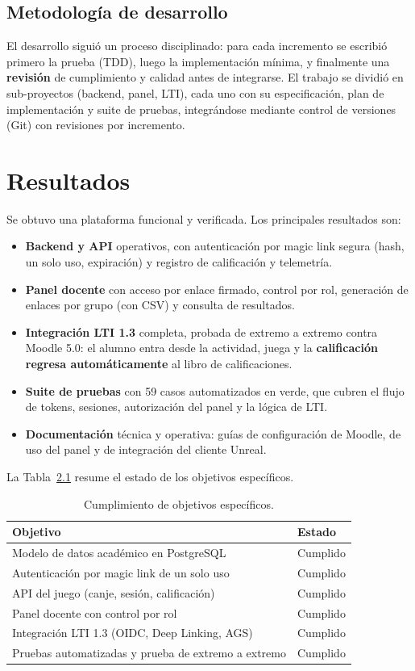 \documentclass[12pt,letterpaper,oneside]{report}
\begin{document}
\section{Metodología de desarrollo}
El desarrollo siguió un proceso disciplinado: para cada incremento se escribió
primero la prueba (TDD), luego la implementación mínima, y finalmente una
\textbf{revisión} de cumplimiento y calidad antes de integrarse. El trabajo se
dividió en sub-proyectos (backend, panel, LTI), cada uno con su especificación,
plan de implementación y suite de pruebas, integrándose mediante control de
versiones (Git) con revisiones por incremento.

\chapter{Resultados}

Se obtuvo una plataforma funcional y verificada. Los principales resultados son:

\begin{itemize}[leftmargin=1.4em]
  \item \textbf{Backend y API} operativos, con autenticación por magic link
  segura (hash, un solo uso, expiración) y registro de calificación y telemetría.
  \item \textbf{Panel docente} con acceso por enlace firmado, control por rol,
  generación de enlaces por grupo (con CSV) y consulta de resultados.
  \item \textbf{Integración LTI 1.3} completa, probada de extremo a extremo contra
  Moodle 5.0: el alumno entra desde la actividad, juega y la \textbf{calificación
  regresa automáticamente} al libro de calificaciones.
  \item \textbf{Suite de pruebas} con 59 casos automatizados en verde, que cubren
  el flujo de tokens, sesiones, autorización del panel y la lógica de LTI.
  \item \textbf{Documentación} técnica y operativa: guías de configuración de
  Moodle, de uso del panel y de integración del cliente Unreal.
\end{itemize}

La Tabla~\ref{tab:result} resume el estado de los objetivos específicos.

\begin{longtable}{p{10.5cm} p{2.8cm}}
\caption{Cumplimiento de objetivos específicos.}\label{tab:result}\\
\toprule
\textbf{Objetivo} & \textbf{Estado} \\ \midrule
\endhead
Modelo de datos académico en PostgreSQL & Cumplido \\
Autenticación por magic link de un solo uso & Cumplido \\
API del juego (canje, sesión, calificación) & Cumplido \\
Panel docente con control por rol & Cumplido \\
Integración LTI 1.3 (OIDC, Deep Linking, AGS) & Cumplido \\
Pruebas automatizadas y prueba de extremo a extremo & Cumplido \\
\bottomrule
\end{longtable}
\end{document}
